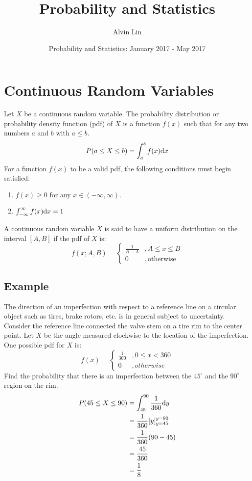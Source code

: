 \documentclass{math}
\title{Probability and Statistics}
\author{Alvin Lin}
\date{Probability and Statistics: January 2017 - May 2017}
\begin{document}
\maketitle

\section*{Continuous Random Variables}
Let \( X \) be a continuous random variable. The probability distribution or
probability density function (pdf) of \( X \) is a function \( f(x) \) such that
for any two numbers \( a \) and \( b \) with \( a \leq b \).
\[ P(a\leq X\leq b) = \int_{a}^{b}f(x)\mathrm{d}{x} \]
For a function \( f(x) \) to be a valid pdf, the following conditions must begin
satisfied:
\begin{enumerate}
  \item \( f(x) \geq 0 \) for any \( x \in (-\infty,\infty) \).
  \item \( \int_{-\infty}^{\infty}f(x)\mathrm{d}{x} = 1 \)
\end{enumerate}
A continuous random variable \( X \) is said to have a uniform distribution on
the interval \( [A,B] \) if the pdf of \( X \) is:
\[ f(x;A,B) =
  \begin{cases}
    \frac{1}{B-A} &, A\leq x\leq B \\
    0 &, \mathrm{otherwise}
  \end{cases}
\]

\subsection*{Example}
The direction of an imperfection with respect to a reference line on a
circular object such as tires, brake rotors, etc. is in general subject to
uncertainty. Consider the reference line connected the valve stem on a tire rim
to the center point. Let \( X \) be the angle measured clockwise to the location
of the imperfection. One possible pdf for \( X \) is:
\[ f(x) =
  \begin{cases}
    \frac{1}{360} &, 0 \leq x < 360 \\
    0 &, otherwise
  \end{cases}
\]
Find the probability that there is an imperfection between the \( 45^{\circ} \)
and the \( 90^{\circ} \) region on the rim.
\begin{align*}
  P(45\leq X\leq 90) &= \int_{45}^{90}\frac{1}{360}\mathrm{d}{y} \\
  &= \frac{1}{360}[y]_{y=45}^{y=90} \\
  &= \frac{1}{360}(90-45) \\
  &= \frac{45}{360} \\
  &= \frac{1}{8}
\end{align*}
\end{document}
